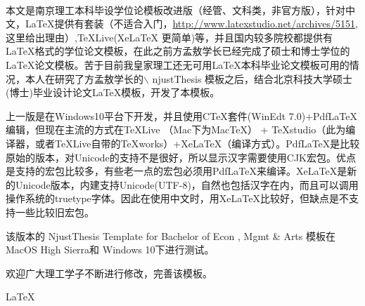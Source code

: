 


\fancyhead[LE,RO]{}
\fancyhead[RE,LO]{}
\cfoot{}
\thisfancypage{%
	\setlength{\fboxsep}{0pt}%
	\setlength{\fboxrule}{0.8pt}%
	\setlength{\shadowsize}{0pt}%
	\shadowbox}{}

\songti
\begin{spacing}{1.5}%
	\begin{center}
		\begin{minipage}[b]{0.95\linewidth}
			 \quad \\ [0.5ex]		
			 
\qquad 本文是南京理工本科毕设学位论模板改进版（经管、文科类，非官方版），针对中文，\LaTeX 提供有\CTeX 套装（不适合入门，\url{http://www.latexstudio.net/archives/5151},这里给出理由）,TeXLive(XeLaTeX 更简单)等，并且国内较多院校都提供有\LaTeX 格式的学位论文模板，在此之前方孟敖学长已经完成了硕士和博士学位的\LaTeX 论文模板。苦于目前我皇家理工还无可用\LaTeX 本科毕业论文模板可用的情况，本人在研究了方孟敖学长的$\backslash$ njustThesis 模板之后，结合北京科技大学硕士(博士)毕业设计论文\LaTeX 模板，开发了本模板。
			
\qquad 上一版是在Windows10平台下开发，并且使用CTeX套件(WinEdt 7.0)+PdfLaTeX编辑，但现在主流的方式在TeXLive （Mac下为MacTeX） + TeXstudio（此为编译器，或者TeXLive自带的TeXworks）+XeLaTeX（编译方式）。PdfLaTeX是比较原始的版本，对Unicode的支持不是很好，所以显示汉字需要使用CJK宏包。优点是支持的宏包比较多，有些老一点的宏包必须用PdfLaTeX来编译。XeLaTeX是新的Unicode版本，内建支持Unicode(UTF-8)，自然也包括汉字在内，而且可以调用操作系统的truetype字体。因此在使用中文时，用XeLaTeX比较好，但缺点是不支持一些比较旧宏包。

\qquad 该版本的 NjustThesis Template for Bachelor of Econ , Mgmt \& Arts 模板在MacOS High Sierra和 Windows 10下进行测试。

\qquad 欢迎广大理工学子不断进行修改，完善该模板。
			
\vspace{8ex}
  \songti \qquad \LaTeX  \qquad \CTeX
		\end{minipage}
	\end{center}
\end{spacing}



